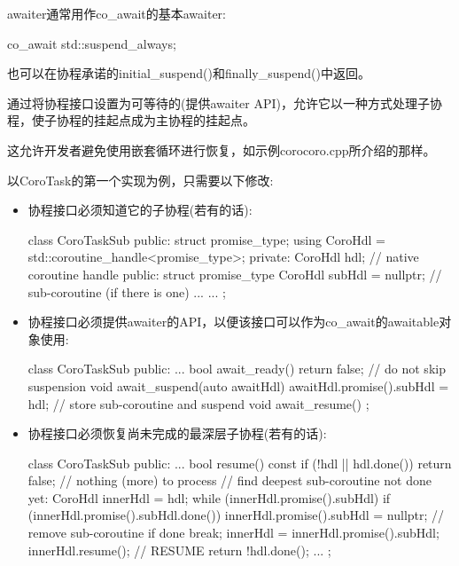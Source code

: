 awaiter通常用作co\_await的基本awaiter:

\begin{cpp}
co_await std::suspend_always{};
\end{cpp}

也可以在协程承诺的initial\_suspend()和finally\_suspend()中返回。


通过将协程接口设置为可等待的(提供awaiter API)，允许它以一种方式处理子协程，使子协程的挂起点成为主协程的挂起点。

这允许开发者避免使用嵌套循环进行恢复，如示例corocoro.cpp所介绍的那样。

以CoroTask的第一个实现为例，只需要以下修改:

\begin{itemize}
\item
协程接口必须知道它的子协程(若有的话):

\begin{cpp}
class CoroTaskSub {
public:
	struct promise_type;
	using CoroHdl = std::coroutine_handle<promise_type>;
private:
	CoroHdl hdl; // native coroutine handle
public:
	struct promise_type {
		CoroHdl subHdl = nullptr; // sub-coroutine (if there is one)
		...
	}
	...
};
\end{cpp}

\item
协程接口必须提供awaiter的API，以便该接口可以作为co\_await的awaitable对象使用:

\begin{cpp}
class CoroTaskSub {
	public:
	...
	bool await_ready() { return false; } // do not skip suspension
	void await_suspend(auto awaitHdl) {
		awaitHdl.promise().subHdl = hdl; // store sub-coroutine and suspend
	}
	void await_resume() { }
};
\end{cpp}

\item
协程接口必须恢复尚未完成的最深层子协程(若有的话):

\begin{cpp}
class CoroTaskSub {
	public:
	...
	bool resume() const {
		if (!hdl || hdl.done()) {
			return false; // nothing (more) to process
		}
		// find deepest sub-coroutine not done yet:
		CoroHdl innerHdl = hdl;
		while (innerHdl.promise().subHdl) {
			if (innerHdl.promise().subHdl.done()) {
				innerHdl.promise().subHdl = nullptr; // remove sub-coroutine if done
				break;
			}
			innerHdl = innerHdl.promise().subHdl;
		}
		innerHdl.resume(); // RESUME
		return !hdl.done();
	}
	...
};
\end{cpp}
\end{itemize}

